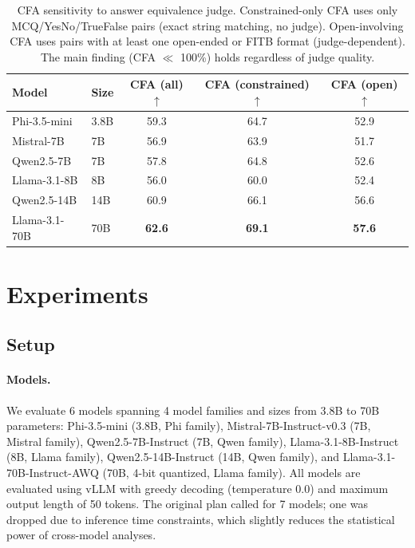 \documentclass{article}
\begin{document}
\begin{table}[t]
\caption{CFA sensitivity to answer equivalence judge. Constrained-only CFA uses only MCQ/YesNo/TrueFalse pairs (exact string matching, no judge). Open-involving CFA uses pairs with at least one open-ended or FITB format (judge-dependent). The main finding (CFA $\ll$ 100\%) holds regardless of judge quality.}
\label{tab:sensitivity}
\centering
\small
\begin{tabular}{llccc}
\toprule
Model & Size & CFA (all) $\uparrow$ & CFA (constrained) $\uparrow$ & CFA (open) $\uparrow$ \\
\midrule
Phi-3.5-mini & 3.8B & 59.3 & 64.7 & 52.9 \\
Mistral-7B & 7B & 56.9 & 63.9 & 51.7 \\
Qwen2.5-7B & 7B & 57.8 & 64.8 & 52.6 \\
Llama-3.1-8B & 8B & 56.0 & 60.0 & 52.4 \\
Qwen2.5-14B & 14B & 60.9 & 66.1 & 56.6 \\
Llama-3.1-70B & 70B & \textbf{62.6} & \textbf{69.1} & \textbf{57.6} \\
\bottomrule
\end{tabular}
\end{table}

\section{Experiments}
\label{sec:experiments}

\subsection{Setup}

\paragraph{Models.} We evaluate 6 models spanning 4 model families and sizes from 3.8B to 70B parameters: Phi-3.5-mini (3.8B, Phi family), Mistral-7B-Instruct-v0.3 (7B, Mistral family), Qwen2.5-7B-Instruct (7B, Qwen family), Llama-3.1-8B-Instruct (8B, Llama family), Qwen2.5-14B-Instruct (14B, Qwen family), and Llama-3.1-70B-Instruct-AWQ (70B, 4-bit quantized, Llama family). All models are evaluated using vLLM with greedy decoding (temperature 0.0) and maximum output length of 50 tokens. The original plan called for 7 models; one was dropped due to inference time constraints, which slightly reduces the statistical power of cross-model analyses.
\end{document}
